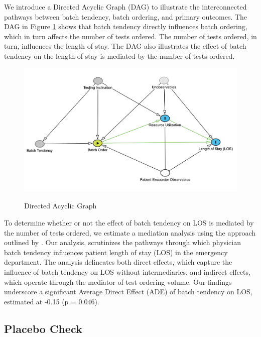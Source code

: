 \documentclass[,,nonblindrev]{informs}
\begin{document}
We introduce a Directed Acyclic Graph (DAG) to illustrate the
interconnected pathways between batch tendency, batch ordering, and
primary outcomes. The DAG in Figure \ref{fig:DAG} shows that batch
tendency directly influences batch ordering, which in turn affects the
number of tests ordered. The number of tests ordered, in turn,
influences the length of stay. The DAG also illustrates the effect of
batch tendency on the length of stay is mediated by the number of tests
ordered.

\begin{figure}[h]
  \centering
  \caption{Directed Acyclic Graph}
  \label{fig:DAG}
  \includegraphics[width=6in]{../outputs/figures/dagitty.png}
\begin{tablenotes}
\small
\item \textit{}
\end{tablenotes}  
\end{figure}

To determine whether or not the effect of batch tendency on LOS is
mediated by the number of tests ordered, we estimate a mediation
analysis using the approach outlined by \citet{imai2010general}. Our
analysis, scrutinizes the pathways through which physician batch
tendency influences patient length of stay (LOS) in the emergency
department. The analysis delineates both direct effects, which capture
the influence of batch tendency on LOS without intermediaries, and
indirect effects, which operate through the mediator of test ordering
volume. Our findings underscore a significant Average Direct Effect
(ADE) of batch tendency on LOS, estimated at -0.15 (p = 0.046).

\hypertarget{placebo-check}{%
\subsection{Placebo Check}\label{placebo-check}}
\end{document}
